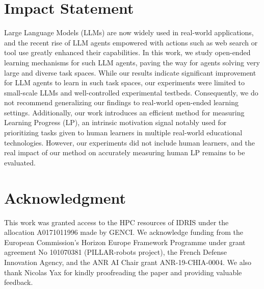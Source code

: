 \documentclass{article}
\begin{document}
\section*{Impact Statement}
Large Language Models (LLMs) are now widely used in real-world applications, and the recent rise of LLM agents empowered with actions such as web search or tool use greatly enhanced their capabilities. In this work, we study open-ended learning mechanisms for such LLM agents, paving the way for agents solving very large and diverse task spaces. While our results indicate significant improvement for LLM agents to learn in such task spaces, our experiments were limited to small-scale LLMs and well-controlled experimental testbeds. Consequently, we do not recommend generalizing our findings to real-world open-ended learning settings.
Additionally, our work introduces an efficient method for measuring Learning Progress (LP), an intrinsic motivation signal notably used for prioritizing tasks given to human learners in multiple real-world educational technologies. However, our experiments did not include human learners, and the real impact of our method on accurately measuring human LP remains to be evaluated.

\section*{Acknowledgment}
This work was granted access to the HPC resources of IDRIS under the allocation A0171011996 made by GENCI. We acknowledge funding from the European Commission’s Horizon Europe Framework Programme under grant agreement No 101070381 (PILLAR-robots project), the French Defense Innovation Agency, and the ANR AI Chair grant ANR-19-CHIA-0004. We also thank Nicolas Yax for kindly proofreading the paper and providing valuable feedback.

\end{document}
